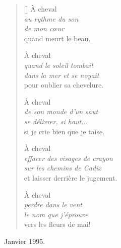 \documentclass[a4paper,11pt]{article}
\begin{document}

\settowidth{\versewidth}{effacer des visages de crayon}

\bigskip

\begin{verse}[\versewidth]
  À cheval \\
  \qquad \emph{au rythme du son} \\
  \qquad \emph{de mon cœur} \\
  quand meurt le beau.

  À cheval \\
  \qquad \emph{quand le soleil tombait} \\
  \qquad \emph{dans la mer et se noyait} \\
  pour oublier sa chevelure.

  À cheval \\
  \qquad \emph{de son monde d'un saut} \\
  \qquad \emph{se délivrer, si haut...} \\
  si je crie bien que je taise.

  À cheval \\
  \qquad \emph{effacer des visages de crayon} \\
  \qquad \emph{sur les chemins de Cadix} \\
  et laisser derrière le jugement.

  À cheval \\
  \qquad \emph{perdre dans le vent} \\
  \qquad \emph{le nom que j'éprouve} \\
  vers les fleurs de mai!
\end{verse}

\bigskip
\bigskip

\hfill Janvier 1995.
\end{document}
